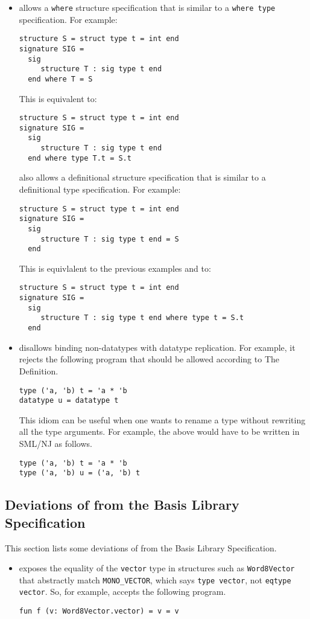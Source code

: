 \begin{itemize}
\item
{\smlnj} allows a {\tt where} structure specification that is similar
to a {\tt where type} specification.  For example:
\begin{verbatim}
structure S = struct type t = int end
signature SIG =
  sig
     structure T : sig type t end
  end where T = S
\end{verbatim}
This is equivalent to:
\begin{verbatim}
structure S = struct type t = int end
signature SIG =
  sig
     structure T : sig type t end
  end where type T.t = S.t
\end{verbatim}
{\smlnj} also allows a definitional structure specification that is
similar to a definitional type specification.  For example:
\begin{verbatim}
structure S = struct type t = int end
signature SIG =
  sig
     structure T : sig type t end = S
  end
\end{verbatim}
This is equivlalent to the previous examples and to:
\begin{verbatim}
structure S = struct type t = int end
signature SIG =
  sig
     structure T : sig type t end where type t = S.t
  end
\end{verbatim}
%
\item
{\smlnj} disallows binding non-datatypes with datatype replication.
For example, it rejects the following program that should be allowed
according to The Definition.
\begin{verbatim}
type ('a, 'b) t = 'a * 'b
datatype u = datatype t
\end{verbatim}
This idiom can be useful when one wants to rename a type without
rewriting all the type arguments.  For example, the above would have
to be written in SML/NJ as follows.
\begin{verbatim}
type ('a, 'b) t = 'a * 'b
type ('a, 'b) u = ('a, 'b) t
\end{verbatim}

\end{itemize}

\subsection{Deviations of {\smlnj} from the Basis Library Specification}
%
This section lists some deviations of {\smlnj} from the Basis Library
Specification. 
\begin{itemize}
\item
{\smlnj} exposes the equality of the {\tt vector} type in structures
such as {\tt Word8Vector} that abstractly match {\tt MONO\_VECTOR},
which says {\tt type vector}, not {\tt eqtype vector}.  So, for
example, {\smlnj} accepts the following program.
\begin{verbatim}
fun f (v: Word8Vector.vector) = v = v
\end{verbatim}
\end{itemize}
